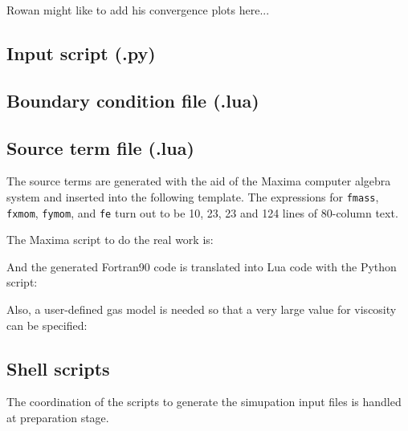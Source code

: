 \bigskip\noindent
Rowan might like to add his convergence plots here...

\newpage
\subsection{Input script (.py)}
\topbar

\bottombar

\newpage
\subsection{Boundary condition file (.lua)}
\topbar

\bottombar

\newpage
\subsection{Source term file (.lua)}
%
The source terms are generated with the aid of the Maxima computer algebra system
and inserted into the following template.
The expressions for \texttt{fmass}, \texttt{fxmom}, \texttt{fymom}, and \texttt{fe}
turn out to be 10, 23, 23 and 124 lines of 80-column text.\\
\topbar

\bottombar

\bigskip
\noindent
The Maxima script to do the real work is:\\
\topbar

\bottombar

\bigskip
\noindent
And the generated Fortran90 code is translated into Lua code with the Python script:\\
\topbar

\bottombar

\newpage
\noindent
Also, a user-defined gas model is needed so that a very large value for viscosity can be specified:\\
\topbar

\bottombar

\newpage
\subsection{Shell scripts}
\label{mms-viscous-sh-files}
The coordination of the scripts to generate the simupation input files is handled at 
preparation stage.\\
\topbar

\bottombar

